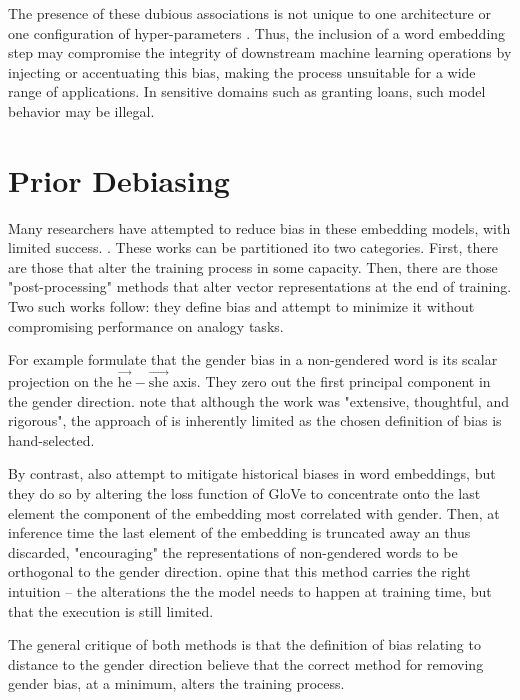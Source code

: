 \documentclass[11pt,a4paper]{article}
\begin{document}
The presence of these dubious associations is not unique to one architecture or one configuration of hyper-parameters \cite{origins-1810-03611}. Thus, the inclusion of a word embedding step may compromise the integrity of downstream machine learning operations by injecting or accentuating this bias, making the process unsuitable for a wide range of applications. In sensitive domains such as granting loans, such model behavior may be illegal.

\section{Prior Debiasing}

Many researchers have attempted to reduce bias in these embedding models, with limited success. \citet{caliskan2017semantics}. These works can be partitioned ito two categories. First, there are those that alter the training process in some capacity. Then, there are those "post-processing" methods that alter vector representations at the end of training. Two such works follow: they define bias and attempt to minimize it without compromising performance on analogy tasks.

For example \citet{bolukbasi2016man} formulate that the gender bias in a non-gendered word is its scalar projection on the $\Vec{\text{he}} - \Vec{\text{she}}$ axis. They zero out the first principal component in the gender direction.  \citet{lipstick-1903-03862} note that although the work was "extensive, thoughtful, and rigorous", the approach of \citet{bolukbasi2016man} is inherently limited as the chosen definition of bias is hand-selected. 

By contrast, \citet{zhao2018learning} also attempt to mitigate historical biases in word embeddings, but they do so by altering the loss function of GloVe to concentrate onto the last element the component of the embedding most correlated with gender. Then, at inference time the last element of the embedding is truncated away an thus discarded, "encouraging" the representations of non-gendered words to be orthogonal to the gender direction. \citet{lipstick-1903-03862} opine that this method carries the right intuition -- the alterations the the model needs to happen at training time, but that the execution is still limited.

The general critique of both methods is that the definition of bias relating to distance to the gender direction \citet{lipstick-1903-03862} believe that the correct method for removing gender bias, at a minimum, alters the training process.
\end{document}
